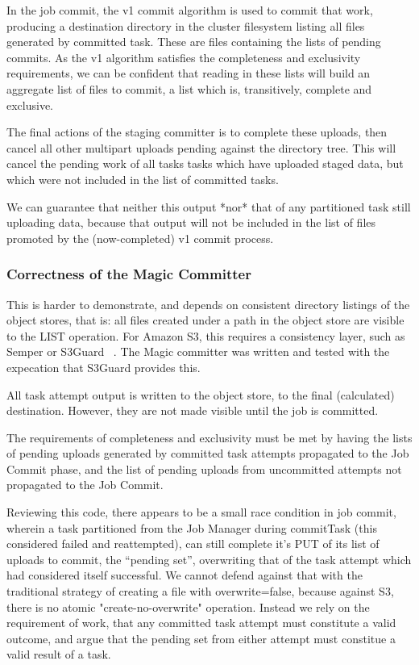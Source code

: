 \documentclass[conference]{IEEEtran}
\begin{document}
In the job commit, the v1 commit algorithm is used to commit that work, producing
a destination directory in the cluster filesystem listing all files generated
by committed task.
These are files containing the lists of pending commits.
As the v1 algorithm satisfies the completeness and exclusivity requirements,
we can be confident that reading in these lists will build an aggregate list
of files to commit, a list which is, transitively, complete and exclusive.

The final actions of the staging committer is to complete these uploads,
then cancel all other multipart uploads pending against the directory tree.
This will cancel the pending work of all tasks tasks which have uploaded staged
data, but which were not included in the list of committed tasks.

We can guarantee that neither this output *nor* that of any partitioned
task still uploading data, because that output will not be included in the
list of files promoted by the (now-completed) v1 commit process.

\subsubsection{Correctness of the Magic Committer}

This is harder to demonstrate, and depends on consistent directory
listings of the object stores, that is: all files created under a path
in the object store are visible to the LIST operation.
For Amazon S3, this requires a consistency layer, such as Semper or S3Guard
\ \cite{Semper,HADOOP-13345}.
The Magic committer was written and tested with the expecation that S3Guard
provides this.

All task attempt output is written to the object store, to the final (calculated)
destination.
However, they are not made visible until the job is committed.

The requirements of completeness and exclusivity must be met by
having the lists of pending uploads generated by committed task attempts propagated
to the Job Commit phase, and the list of pending uploads from uncommitted
attempts not propagated to the Job Commit.


Reviewing this code, there appears to be a small race condition in job commit,
wherein a task partitioned from the Job Manager during commitTask
(this considered failed and reattempted),
can still complete it's PUT of its list of uploads to commit, the ``pending set'',
overwriting that of the task attempt which had considered itself successful.
We cannot defend against that with the traditional strategy of creating
a file with overwrite=false, because against S3, there is no atomic
"create-no-overwrite" operation.
Instead we rely on the requirement of work, that any committed task attempt must
constitute a valid outcome, and argue that the pending set from either attempt
must constitue a valid result of a task.
\end{document}
